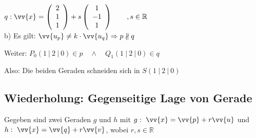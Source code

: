 $q: \vv{x} = \left(\begin{array}{c}  2 \\ 1 \\ 1 \end{array}\right) + s \left(\begin{array}{c}  1 \\ -1 \\ 1 \end{array}\right) \qquad ,s \in \mathbb{R}$ \\

b) Es gilt: $\vv{u_p} \neq k \cdot \vv{u_q} \Rightarrow p \nparallel q$

Weiter: $P_0 (1 \ | \ 2 \ | \ 0) \in p \quad \land \quad Q_1 (1 \ | \ 2 \ | \ 0) \in q$

Also: Die beiden Geraden schneiden sich in $S (1 \ | \ 2 \ | \ 0)$


\pagebreak

\subsection{Wiederholung: Gegenseitige Lage von Gerade}

Gegeben sind zwei Geraden $g$ und $h$ mit $g: \ \vv{x} = \vv{p} + r \vv{u}$ und $h: \ \vv{x} = \vv{q} + r \vv{v}$, wobei $r,s \in \mathbb{R}$

